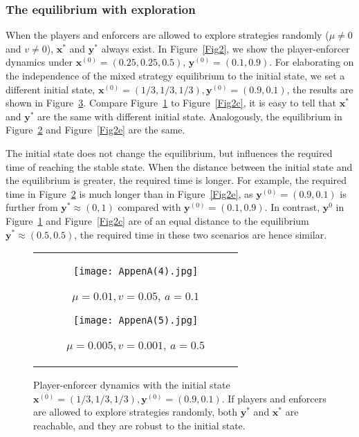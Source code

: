 \documentclass[letterpaper,10pt]{article}
\numberwithin{equation}{section}
\begin{document}
    
\subsubsection{The equilibrium with exploration} \label{AppendixA22}
When the players and enforcers are allowed to explore strategies randomly ($ \mu \neq 0 $ and $ v \neq 0 $), $ \mathbf{x}^* $ and $ \mathbf{y}^* $ always exist. In Figure~\ref{Fig2}, we show the player-enforcer dynamics under $ \mathbf{x}^{(0)} = (0.25, 0.25, 0.5) $, $ \mathbf{y}^{(0)} = (0.1, 0.9) $. For elaborating on the independence of the mixed strategy equilibrium to the initial state, we set a different initial state, $ \mathbf{x}^{(0)} = (1/3, 1/3, 1/3), \mathbf{y}^{(0)} = (0.9, 0.1) $, the results are shown in Figure~\ref{AppendBFig2}. Compare Figure~\ref{AppenA4} to Figure~\ref{Fig2c}, it is easy to tell that $ \mathbf{x}^* $ and $ \mathbf{y}^* $ are the same with different initial state. Analogously, the equilibrium in Figure~\ref{AppenA5} and Figure~\ref{Fig2e} are the same.

The initial state does not change the equilibrium, but influences the required time of reaching the stable state. When the distance between the initial state and the equilibrium is greater, the required time is longer. For example, the required time in Figure~\ref{AppenA5} is much longer than in Figure~\ref{Fig2e}, as $ \mathbf{y}^{(0)} = (0.9, 0.1) $ is further from $ \mathbf{y}^*\approx (0, 1) $ compared with $ \mathbf{y}^{(0)} = (0.1, 0.9) $. In contrast, $ \mathbf{y}^{0} $ in Figure~\ref{AppenA4} and Figure~\ref{Fig2c} are of an equal distance to the equilibrium $ \mathbf{y}^* \approx (0.5, 0.5) $, the required time in these two scenarios are hence similar.

\begin{figure}[H]
    \centering
    \begin{tabular}{c}
        \begin{subfigure}[b]{0.5\textwidth}
            \texttt{[image: AppenA(4).jpg]}
            \caption{$ \mu = 0.01, v = 0.05 $, $ a = 0.1 $}
            \label{AppenA4}
        \end{subfigure}
        \begin{subfigure}[b]{0.5\textwidth}
            \texttt{[image: AppenA(5).jpg]}
            \caption{$ \mu = 0.005, v = 0.001 $, $ a = 0.5 $}
            \label{AppenA5}
        \end{subfigure}
    \end{tabular}
    \caption{Player-enforcer dynamics with the initial state $ \mathbf{x}^{(0)} = (1/3, 1/3, 1/3), \mathbf{y}^{(0)} = (0.9,0.1) $. If players and enforcers are allowed to explore strategies randomly, both $ \mathbf{y}^* $ and $ \mathbf{x}^*$ are reachable, and they are robust to the initial state.}
    \label{AppendBFig2}
\end{figure}
\end{document}
